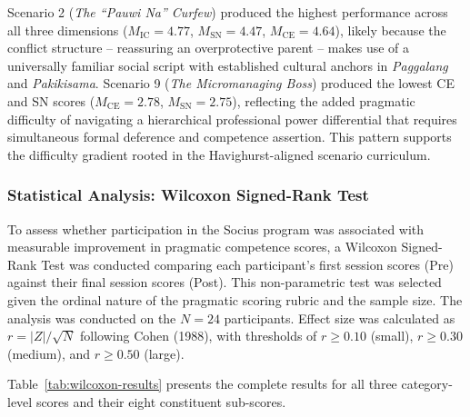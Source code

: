 \noindent Scenario 2 (\textit{The ``Pauwi Na'' Curfew}) produced the highest performance across all three dimensions ($M_{\text{IC}} = 4.77$, $M_{\text{SN}} = 4.47$, $M_{\text{CE}} = 4.64$), likely because the conflict structure -- reassuring an overprotective parent -- makes use of a universally familiar social script with established cultural anchors in \textit{Paggalang} and \textit{Pakikisama}. Scenario 9 (\textit{The Micromanaging Boss}) produced the lowest CE and SN scores ($M_{\text{CE}} = 2.78$, $M_{\text{SN}} = 2.75$), reflecting the added pragmatic difficulty of navigating a hierarchical professional power differential that requires simultaneous formal deference and competence assertion. This pattern supports the difficulty gradient rooted in the Havighurst-aligned scenario curriculum.

\subsubsection{Statistical Analysis: Wilcoxon Signed-Rank Test}

To assess whether participation in the Socius program was associated with measurable improvement in pragmatic competence scores, a Wilcoxon Signed-Rank Test was conducted comparing each participant's first session scores (Pre) against their final session scores (Post). This non-parametric test was selected given the ordinal nature of the pragmatic scoring rubric and the sample size. The analysis was conducted on the $N = 24$ participants. Effect size was calculated as $r = |Z| / \sqrt{N}$ following Cohen (1988), with thresholds of $r \geq 0.10$ (small), $r \geq 0.30$ (medium), and $r \geq 0.50$ (large).

Table~\ref{tab:wilcoxon-results} presents the complete results for all three category-level scores and their eight constituent sub-scores.

